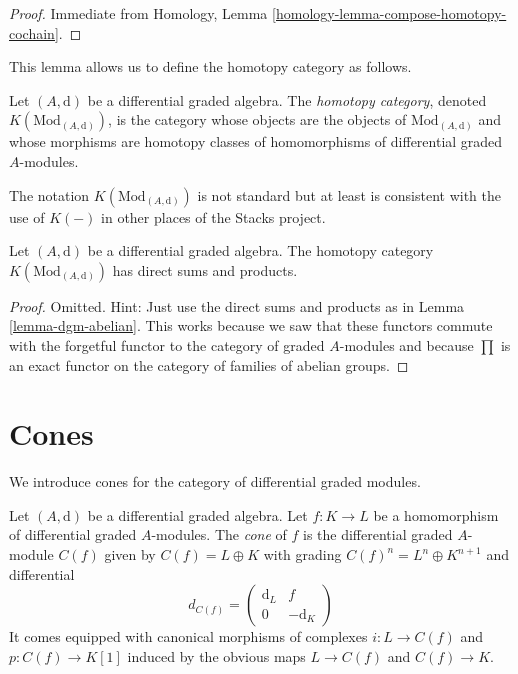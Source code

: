 \begin{proof}
Immediate from Homology, Lemma \ref{homology-lemma-compose-homotopy-cochain}.
\end{proof}

\noindent
This lemma allows us to define the homotopy category as follows.

\begin{definition}
\label{definition-complexes-notation}
Let $(A, \text{d})$ be a differential graded algebra.
The {\it homotopy category}, denoted $K(\text{Mod}_{(A, \text{d})})$, is
the category whose objects are the objects of
$\text{Mod}_{(A, \text{d})}$ and whose morphisms are homotopy classes
of homomorphisms of differential graded $A$-modules.
\end{definition}

\noindent
The notation $K(\text{Mod}_{(A, \text{d})})$ is not standard but at least is
consistent with the use of $K(-)$ in other places of the Stacks project.

\begin{lemma}
\label{lemma-homotopy-direct-sums}
Let $(A, \text{d})$ be a differential graded algebra.
The homotopy category $K(\text{Mod}_{(A, \text{d})})$
has direct sums and products.
\end{lemma}

\begin{proof}
Omitted. Hint: Just use the direct sums and products as in
Lemma \ref{lemma-dgm-abelian}. This works because we saw that
these functors commute with the forgetful functor to the category
of graded $A$-modules and because $\prod$ is an exact functor
on the category of families of abelian groups.
\end{proof}







\section{Cones}
\label{section-cones}

\noindent
We introduce cones for the category of differential graded modules.

\begin{definition}
\label{definition-cone}
Let $(A, \text{d})$ be a differential graded algebra.
Let $f : K \to L$ be a homomorphism of differential graded $A$-modules.
The {\it cone} of $f$ is the differential graded $A$-module
$C(f)$ given by $C(f) = L \oplus K$ with grading
$C(f)^n = L^n \oplus K^{n + 1}$ and
differential
$$
d_{C(f)} =
\left(
\begin{matrix}
\text{d}_L & f \\
0 & -\text{d}_K
\end{matrix}
\right)
$$
It comes equipped with canonical morphisms of complexes $i : L \to C(f)$
and $p : C(f) \to K[1]$ induced by the obvious maps $L \to C(f)$
and $C(f) \to K$.
\end{definition}

